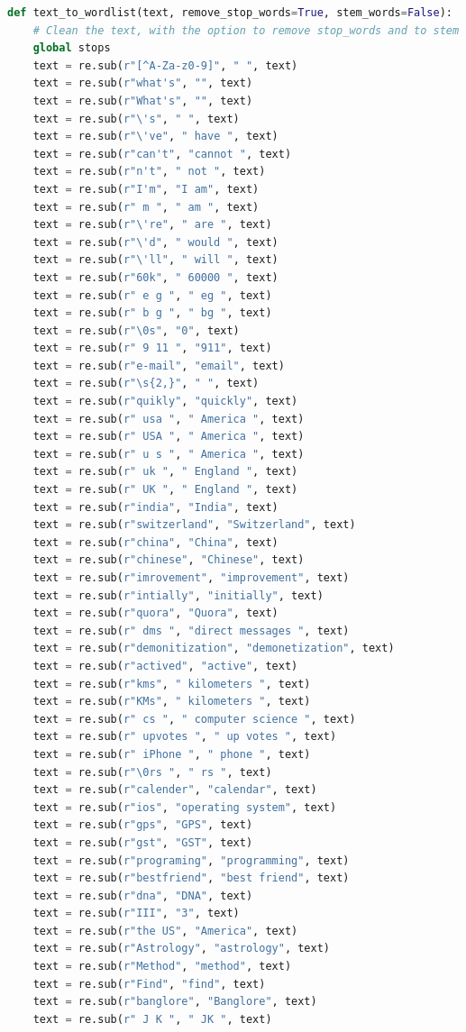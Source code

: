 \documentclass{article}
\begin{document}
\begin{lstlisting}[language=python]
def text_to_wordlist(text, remove_stop_words=True, stem_words=False):
    # Clean the text, with the option to remove stop_words and to stem words.
    global stops
    text = re.sub(r"[^A-Za-z0-9]", " ", text)
    text = re.sub(r"what's", "", text)
    text = re.sub(r"What's", "", text)
    text = re.sub(r"\'s", " ", text)
    text = re.sub(r"\'ve", " have ", text)
    text = re.sub(r"can't", "cannot ", text)
    text = re.sub(r"n't", " not ", text)
    text = re.sub(r"I'm", "I am", text)
    text = re.sub(r" m ", " am ", text)
    text = re.sub(r"\'re", " are ", text)
    text = re.sub(r"\'d", " would ", text)
    text = re.sub(r"\'ll", " will ", text)
    text = re.sub(r"60k", " 60000 ", text)
    text = re.sub(r" e g ", " eg ", text)
    text = re.sub(r" b g ", " bg ", text)
    text = re.sub(r"\0s", "0", text)
    text = re.sub(r" 9 11 ", "911", text)
    text = re.sub(r"e-mail", "email", text)
    text = re.sub(r"\s{2,}", " ", text)
    text = re.sub(r"quikly", "quickly", text)
    text = re.sub(r" usa ", " America ", text)
    text = re.sub(r" USA ", " America ", text)
    text = re.sub(r" u s ", " America ", text)
    text = re.sub(r" uk ", " England ", text)
    text = re.sub(r" UK ", " England ", text)
    text = re.sub(r"india", "India", text)
    text = re.sub(r"switzerland", "Switzerland", text)
    text = re.sub(r"china", "China", text)
    text = re.sub(r"chinese", "Chinese", text)
    text = re.sub(r"imrovement", "improvement", text)
    text = re.sub(r"intially", "initially", text)
    text = re.sub(r"quora", "Quora", text)
    text = re.sub(r" dms ", "direct messages ", text)
    text = re.sub(r"demonitization", "demonetization", text)
    text = re.sub(r"actived", "active", text)
    text = re.sub(r"kms", " kilometers ", text)
    text = re.sub(r"KMs", " kilometers ", text)
    text = re.sub(r" cs ", " computer science ", text)
    text = re.sub(r" upvotes ", " up votes ", text)
    text = re.sub(r" iPhone ", " phone ", text)
    text = re.sub(r"\0rs ", " rs ", text)
    text = re.sub(r"calender", "calendar", text)
    text = re.sub(r"ios", "operating system", text)
    text = re.sub(r"gps", "GPS", text)
    text = re.sub(r"gst", "GST", text)
    text = re.sub(r"programing", "programming", text)
    text = re.sub(r"bestfriend", "best friend", text)
    text = re.sub(r"dna", "DNA", text)
    text = re.sub(r"III", "3", text)
    text = re.sub(r"the US", "America", text)
    text = re.sub(r"Astrology", "astrology", text)
    text = re.sub(r"Method", "method", text)
    text = re.sub(r"Find", "find", text)
    text = re.sub(r"banglore", "Banglore", text)
    text = re.sub(r" J K ", " JK ", text)


\end{lstlisting}
\end{document}

